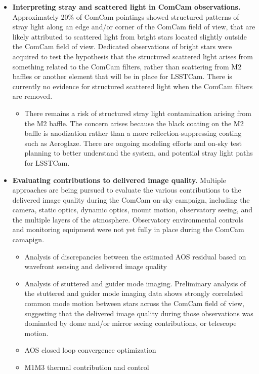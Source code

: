 \begin{itemize}
    \item \textbf{Interpreting stray and scattered light in ComCam observations.} Approximately 20\% of ComCam pointings showed structured patterns of stray light along an edge and/or corner of the ComCam field of view, that are likely attributed to scattered light from bright stars located slightly outside the ComCam field of view.
    Dedicated observations of bright stars were acquired to test the hypothesis that the structured scattered light arises from something related to the ComCam filters, rather than scattering from M2 baffles or another element that will be in place for LSSTCam.
    There is currently no evidence for structured scattered light when the ComCam filters are removed.
    \begin{itemize}
        \item There remains a risk of structured stray light contamination arising from the M2 baffle.
        The concern arises because the black coating on the M2 baffle is anodization rather than a more reflection-suppressing coating such as Aeroglaze.
        There are ongoing modeling efforts and on-sky test planning to better understand the system, and potential stray light paths for LSSTCam.
    \end{itemize}
    \item \textbf{Evaluating contributions to delivered image quality.} Multiple approaches are being pursued to evaluate the various contributions to the delivered image quality during the ComCam on-sky campaign, including the camera, static optics, dynamic optics, mount motion, observatory seeing, and the multiple layers of the atmosphere. Observatory environmental controls and monitoring equipment were not yet fully in place during the ComCam camapign.
    \begin{itemize}
        \item Analysis of discrepancies between the estimated AOS residual based on wavefront sensing and delivered image quality
        \item Analysis of stuttered and guider mode imaging. Preliminary analysis of the stuttered and guider mode imaging data shows strongly correlated common mode motion between stars across the ComCam field of view, suggesting that the delivered image quality during those observations was dominated by dome and/or mirror seeing contributions, or telescope motion.
        \item AOS closed loop convergence optimization
        \item M1M3 thermal contribution and control

\end{itemize}
\end{itemize}

